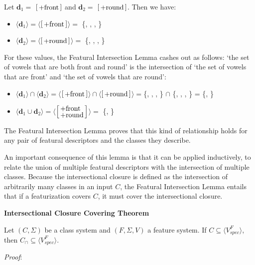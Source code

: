 \documentclass[12pt, oneside]{article}   	%
\newenvironment{clump}
{
	\edef\myindent{\the\parindent}
	\noindent\begin{minipage}{\textwidth}
	\setlength\parindent{\myindent}\fussy
}
{
	\end{minipage}
}
\newcommand{\featmat}[1]
{$\begin{bsmallmatrix*}[l]\text{\normalsize #1}\end{bsmallmatrix*}$}
\newcommand{\featmattwo}[2]{$\begin{bsmallmatrix*}[l]\text{\normalsize #1}\\\text{\normalsize #2}\end{bsmallmatrix*}$}
\begin{document}
\noindent Let $\mathbf{d}_1 =$ \featmat{+front} and $\mathbf{d}_2 =$ \featmat{+round}. Then we have: \begin{itemize}
    \item $\langle \mathbf{d}_1 \rangle = \langle$\featmat{+front}$\rangle =$ \{, , , \textipa{\o}\}
    \item $\langle \mathbf{d}_2 \rangle = \langle$\featmat{+round}$\rangle =$ \{, , , \textipa{\o}\}
    \end{itemize}
\noindent For these values, the Featural Intersection Lemma cashes out as follows: `the set of vowels that are both front and round' is the intersection of `the set of vowels that are front' and `the set of vowels that are round':
 
\begin{itemize}
    \item $\langle \mathbf{d}_1 \rangle \cap \langle \mathbf{d}_2 \rangle =  \langle$\featmat{+front}$\rangle \cap \langle$\featmat{+round}$\rangle =$\{, , , \textipa{\o}\} $\cap$ \{, , , \textipa{\o}\} = \{, \textipa{\o}\}
    \item $\langle \mathbf{d}_1 \cup \mathbf{d}_2 \rangle = \langle$\featmattwo{+front}{+round}$\rangle =$ \{, \textipa{\o}\}
\end{itemize}

\noindent The Featural Intersection Lemma proves that this kind of relationship holds for any pair of featural descriptors and the classes they describe.

An important consequence of this lemma is that it can be applied inductively, to relate the union of multiple featural descriptors with the intersection of multiple classes. Because the intersectional closure is defined as the intersection of arbitrarily many classes in an input $C$, the Featural Intersection Lemma entails that if a featurization covers $C$, it must cover the intersectional closure.

\begin{clump}
\vspace{\baselineskip} \noindent \textbf{Intersectional Closure Covering Theorem}

\noindent Let $(C, \Sigma)$ be a class system and $(F, \Sigma, V)$ a feature system. If $C \subseteq \langle V_{spec}^F \rangle$, then $C_\cap \subseteq \langle V_{spec}^F \rangle $.
\end{clump}
\noindent \textit{Proof}:
\end{document}
